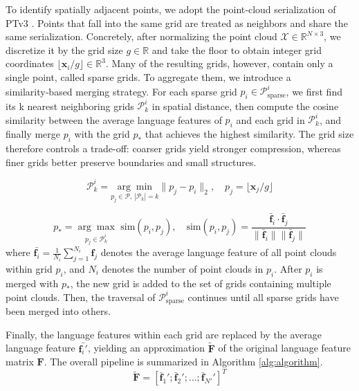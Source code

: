 \documentclass{article}
\begin{document}
To identify spatially adjacent points, we adopt the point‑cloud serialization of PTv3 \cite{wu2024ptv3,wu2022ptv2,wu2024ppt,pointcept2023}. Points that fall into the same grid are treated as neighbors and share the same serialization. Concretely, after normalizing the point cloud $\mathcal{X} \in \mathbb{R}^{N \times 3}$, we discretize it by the grid size $g \in \mathbb{R}$ and take the floor to obtain integer grid coordinates $\lfloor \mathbf{x}_i/g \rfloor \in \mathbb{R}^{3}$.
Many of the resulting grids, however, contain only a single point, called sparse grids. To aggregate them, we introduce a similarity‑based merging strategy. For each sparse grid $p_i \in \mathcal{P}_\text{sparse}^i$, we first find its k nearest neighboring grids $\mathcal{P}_k^i$ in spatial distance, then compute the cosine similarity between the average language features of $p_i$ and each grid in $\mathcal{P}_k^i$, and finally merge $p_i$ with the grid $p_*$ that achieves the highest similarity. The grid size therefore controls a trade-off: coarser grids yield stronger compression, whereas finer grids better preserve boundaries and small structures.

\begin{equation}
    \mathcal{P}_k^i = \underset{p_j \in \mathcal{P},\, |\mathcal{P}_k|=k}{\arg\min} \|p_j - p_i\|_2, \quad p_j = \lfloor \mathbf{x}_j/g \rfloor
\end{equation}

\begin{equation}
    p_* = \underset{p_j \in \mathcal{P}_k^i} {\arg\max} \text{ sim}(p_i, p_j), \quad\text{sim}(p_i, p_j) = \frac{\bar{\mathbf{f}}_i \cdot \bar{\mathbf{f}}_j}{\|\bar{\mathbf{f}}_i\| \|\bar{\mathbf{f}}_j\|}
\end{equation}
where $\bar{\mathbf{f}_i} = \frac{1}{N_i} \sum_{j=1}^{N_i} \mathbf{f}_j$ denotes the average language feature of all point clouds within grid $p_i$, and $N_i$ denotes the number of point clouds in $p_i$. 
After $p_i$ is merged with $p_*$, the new grid is added to the set of grids containing multiple point clouds. Then, the traversal of $\mathcal{P}_\text{sparse}^i$ continues until all sparse grids have been merged into others. 

Finally, the language features within each grid are replaced by the average language feature $\bar{\mathbf{f}_i'}$, yielding an approximation $\tilde{\mathbf{F}}$ of the original language feature matrix $\mathbf{F}$. The overall pipeline is summarized in Algorithm \ref{alg:algorithm}.
\begin{equation}
    \tilde{\mathbf{F}} = [\bar{\mathbf{f}}_1';\bar{\mathbf{f}}_2';\dots;\bar{\mathbf{f}}_{N'}']^T
\end{equation}
\end{document}
